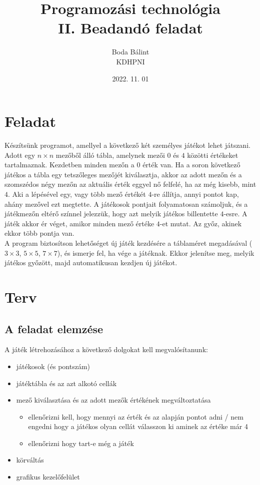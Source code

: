 \documentclass[a4paper,12pt]{article}
\title{\huge{Programozási technológia} \\ \large  II. Beadandó feladat}
\author{Boda Bálint \\ KDHPNI}
\date{2022. 11. 01}
\begin{document}
	\maketitle
	\section{Feladat}
	Készítsünk programot, amellyel a következő két személyes játékot lehet játszani. Adott egy $n \times n$ mezőből álló tábla, amelynek mezői $0$ és $4$ közötti értékeket tartalmaznak. Kezdetben minden mezőn a $0$ érték van. Ha a soron következő játékos a tábla egy tetszőleges mezőjét kiválasztja, akkor az adott mezőn és a szomszédos négy mezőn az aktuális érték eggyel nő felfelé, ha az még kisebb, mint $4$. Aki a lépésével egy, vagy több mező értékét $4$-re állítja, annyi pontot kap, ahány mezővel ezt megtette. A játékosok pontjait folyamatosan számoljuk, és a játékmezőn eltérő színnel jelezzük, hogy azt melyik játékos billentette $4$-esre. A játék akkor ér véget, amikor minden mező értéke $4$-et mutat. Az győz, akinek ekkor több pontja van.
	\\[8pt] \noindent
	A program biztosítson lehetőséget új játék kezdésére a táblaméret megadásával ($3 \times 3$, $5 \times 5$, $7 \times 7$), és ismerje fel, ha vége a játéknak. Ekkor jelenítse meg, melyik játékos győzött, majd automatikusan kezdjen új játékot.
	\newpage
	\section{Terv}
	\subsection{A feladat elemzése}
	A játék létrehozásához a következő dolgokat kell megvalósítanunk:
	\begin{itemize}
		\item játékosok (és pontszám)
		\item játéktábla és az azt alkotó cellák
		\item mező kiválasztása és az adott mezők értékének megváltoztatása
			\begin{itemize}
				\item ellenőrizni kell, hogy mennyi az érték és az alapján pontot adni / nem engedni hogy a játékos olyan cellát válasszon ki aminek az értéke már 4
				\item ellenőrizni hogy tart-e még a játék
			\end{itemize}
		\item körváltás
		\item grafikus kezelőfelület
	\end{itemize}
\end{document}
